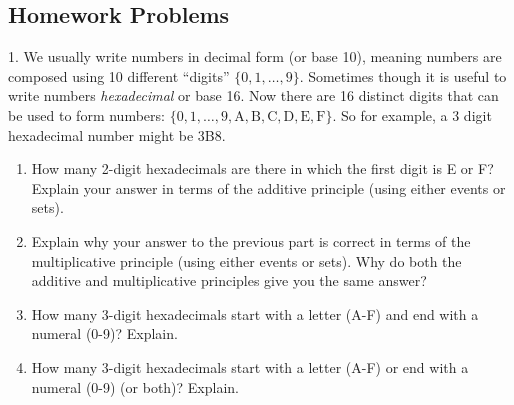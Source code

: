 \documentclass[10pt,]{book}
\theoremstyle{plain}
\theoremstyle{definition}
\theoremstyle{definition}
\theoremstyle{definition}
\numberwithin{equation}{section}
\begin{document}
\subsection[Homework Problems]{Homework Problems}\label{exercises-11}
\begin{exerciselist}
\item[1.]\hypertarget{exercise-124}{}
            We usually write numbers in decimal form (or base 10), meaning numbers are composed using 10 different ``digits'' \(\{0,1,\ldots, 9\}\). Sometimes though it is useful to write numbers \emph{hexadecimal} or base 16. Now there are 16 distinct digits that can be used to form numbers: \(\{0, 1, \ldots, 9, \mathrm{A, B, C, D, E, F}\}\). So for example, a 3 digit hexadecimal number might be 3B8.
\leavevmode%
\begin{enumerate}[label=(\alph*)]
\item\hypertarget{li-776}{}
                How many 2-digit hexadecimals are there in which the first digit is E or F? Explain your answer in terms of the additive principle (using either events or sets).

                
\item\hypertarget{li-777}{}
                Explain why your answer to the previous part is correct in terms of the multiplicative principle (using either events or sets). Why do both the additive and multiplicative principles give you the same answer?

                
\item\hypertarget{li-778}{}
                How many 3-digit hexadecimals start with a letter (A-F) and end with a numeral (0-9)? Explain.

                
\item\hypertarget{li-779}{}
                How many 3-digit hexadecimals start with a letter (A-F) or end with a numeral (0-9) (or both)? Explain.


\end{enumerate}
\end{exerciselist}
\end{document}
